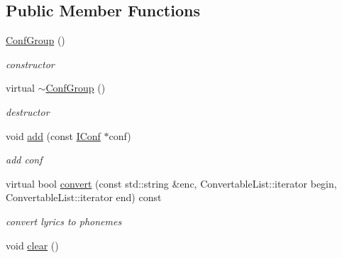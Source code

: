 \subsection*{\-Public \-Member \-Functions}
\begin{DoxyCompactItemize}
\item 
\hypertarget{classsinsy_1_1ConfGroup_a70489be741fc414c8471d64c090910b4}{\hyperlink{classsinsy_1_1ConfGroup_a70489be741fc414c8471d64c090910b4}{\-Conf\-Group} ()}\label{classsinsy_1_1ConfGroup_a70489be741fc414c8471d64c090910b4}

\begin{DoxyCompactList}\small\item\em constructor \end{DoxyCompactList}\item 
\hypertarget{classsinsy_1_1ConfGroup_aea251e5d8c5070e8dc367c42593c2066}{virtual \hyperlink{classsinsy_1_1ConfGroup_aea251e5d8c5070e8dc367c42593c2066}{$\sim$\-Conf\-Group} ()}\label{classsinsy_1_1ConfGroup_aea251e5d8c5070e8dc367c42593c2066}

\begin{DoxyCompactList}\small\item\em destructor \end{DoxyCompactList}\item 
void \hyperlink{classsinsy_1_1ConfGroup_afb98f9e41ce55a486e499e1a8bed08bd}{add} (const \hyperlink{classsinsy_1_1IConf}{\-I\-Conf} $\ast$conf)
\begin{DoxyCompactList}\small\item\em add conf \end{DoxyCompactList}\item 
\hypertarget{classsinsy_1_1ConfGroup_aa68bf11b21932c9a8d4f5e688c157c9c}{virtual bool \hyperlink{classsinsy_1_1ConfGroup_aa68bf11b21932c9a8d4f5e688c157c9c}{convert} (const std\-::string \&enc, \-Convertable\-List\-::iterator begin, \-Convertable\-List\-::iterator end) const }\label{classsinsy_1_1ConfGroup_aa68bf11b21932c9a8d4f5e688c157c9c}

\begin{DoxyCompactList}\small\item\em convert lyrics to phonemes \end{DoxyCompactList}\item 
\hypertarget{classsinsy_1_1ConfGroup_a72dc032a4cddb563c4d882488273a15b}{void \hyperlink{classsinsy_1_1ConfGroup_a72dc032a4cddb563c4d882488273a15b}{clear} ()}\label{classsinsy_1_1ConfGroup_a72dc032a4cddb563c4d882488273a15b}


\end{DoxyCompactItemize}

